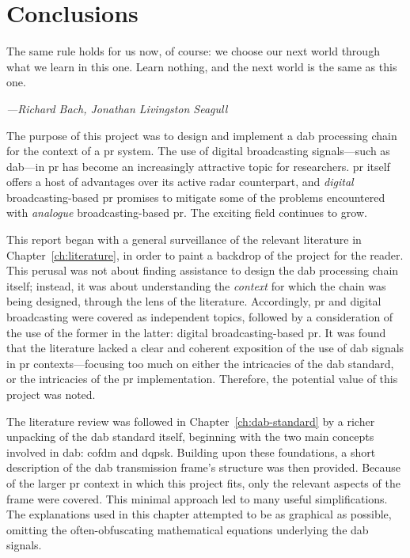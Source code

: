 \documentclass[class=report,11pt,crop=false]{standalone}
\begin{document}
\chapter{Conclusions \label{ch:conclusions}}
\epigraph{The same rule holds for us now, of course: we choose our next world through what we learn in this one. Learn nothing, and the next world is the same as this one.}%
    {\emph{---Richard Bach, Jonathan Livingston Seagull}}
\vspace{0.5cm}

The purpose of this project was to design and implement a \gls{dab} processing chain for the context of a \gls{pr} system. The use of digital broadcasting signals---such as \gls{dab}---in \gls{pr} has become an increasingly attractive topic for researchers. \gls{pr} itself offers a host of advantages over its active radar counterpart, and \emph{digital} broadcasting-based \gls{pr} promises to mitigate some of the problems encountered with \emph{analogue} broadcasting-based \gls{pr}. The exciting field continues to grow.

This report began with a general surveillance of the relevant literature in Chapter~\ref{ch:literature}, in order to paint a backdrop of the project for the reader. This perusal was not about finding assistance to design the \gls{dab} processing chain itself; instead, it was about understanding the \emph{context} for which the chain was being designed, through the lens of the literature. Accordingly, \gls{pr} and digital broadcasting were covered as independent topics, followed by a consideration of the use of the former in the latter: digital broadcasting-based \gls{pr}. It was found that the literature lacked a clear and coherent exposition of the use of \gls{dab} signals in \gls{pr} contexts---focusing too much on either the intricacies of the \gls{dab} standard, or the intricacies of the \gls{pr} implementation. Therefore, the potential value of this project was noted.

The literature review was followed in Chapter~\ref{ch:dab-standard} by a richer unpacking of the \gls{dab} standard itself, beginning with the two main concepts involved in \gls{dab}: \gls{cofdm} and \gls{dqpsk}. Building upon these foundations, a short description of the \gls{dab} transmission frame's structure was then provided. Because of the larger \gls{pr} context in which this project fits, only the relevant aspects of the frame were covered. This minimal approach led to many useful simplifications. The explanations used in this chapter attempted to be as graphical as possible, omitting the often-obfuscating mathematical equations underlying the \gls{dab} signals.
\end{document}
